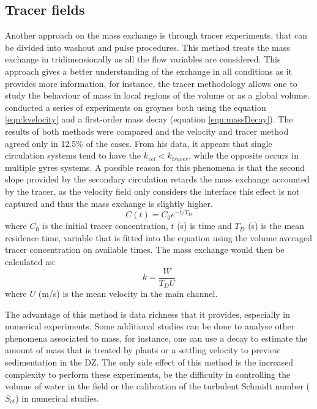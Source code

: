 \subsection{Tracer fields}
Another approach on the mass exchange is through tracer experiments, that can be divided into washout and pulse procedures.  This method treats the mass exchange in tridimensionally as all the flow variables are considered. This approach gives a better understanding of the exchange in all conditions as it provides more information, for instance, the tracer methodology allows one to study the behaviour of mass in local regions of the volume or as a global volume. \textcite{weitbrecht2004} conducted a series of experiments on groynes both using the equation \ref{eqn:kvelocity} and a first-order mass decay (equation \ref{eqn:massDecay}). The results of both methods were compared and the velocity and tracer method agreed only in 12.5\% of the cases. From his data, it appears that single circulation systems tend to have the $k_{vel} < k_{tracer}$, while the opposite occurs in multiple gyres systems. A possible reason for this phenomena is that the second slope provided by the secondary circulation retards the mass exchange accounted by the tracer, as the velocity field only considers the interface this effect is not captured and thus the mass exchange is slightly higher.
\begin{equation}
C(t)=C_0e^{-t/T_D}
\label{eqn:massDecay}
\end{equation}
where $C_0$ is the initial tracer concentration, $t$ (s) is time and $T_D$ (s) is the mean residence time, variable that is fitted into the equation using the volume averaged tracer concentration on available times. The mass exchange would then be calculated as:
\begin{equation}
k=\frac{W}{T_D U}
\label{eqn:ktracer}
\end{equation}
where $U$ (m/s) is the mean velocity in the main channel.

The advantage of this method is data richness that it provides, especially in numerical experiments. Some additional studies can be done to analyse other phenomena associated to mass, for instance, one can use a decay to estimate the amount of mass that is treated by plants or a settling velocity to preview sedimentation in the DZ. The only side effect of this method is the increased complexity to perform these experiments, be the difficulty in controlling the volume of water in the field or the calibration of the turbulent Schmidt number ($S_{ct}$) in numerical studies. 
